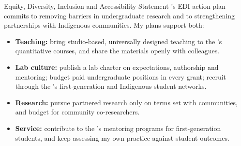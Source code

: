 \begin{applicationdocument}[
  short      = {EDIA Statement},
  page limit = 2,
]{Equity, Diversity, Inclusion and Accessibility Statement}
\Institution's EDI action plan commits to removing barriers in
undergraduate research and to strengthening partnerships with Indigenous
communities. My plans support both:
\begin{itemize}
  \item \textbf{Teaching:} bring studio-based, universally designed teaching
        to the \Department's quantitative courses, and share the materials
        openly with colleagues.
  \item \textbf{Lab culture:} publish a lab charter on expectations,
        authorship and mentoring; budget paid undergraduate positions in
        every grant; recruit through the \Faculty's first-generation and
        Indigenous student networks.
  \item \textbf{Research:} pursue partnered research only on terms set
        with communities, and budget for community co-researchers.
  \item \textbf{Service:} contribute to the \Faculty's mentoring programs
        for first-generation students, and keep assessing my own practice
        against student outcomes.
\end{itemize}

\end{applicationdocument}
